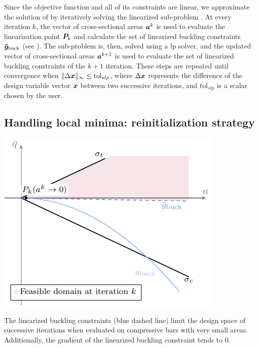 Since the objective function and all of its constraints are linear, we approximate the solution of  by iteratively solving the linearized sub-problem . At every iteration $k$, the vector of cross-sectional areas $\bm{a}^k$ is used to evaluate the linearization point $\bm{P}_{k}$ and calculate the set of linearized buckling constraints $\bm{\tilde{g}}_{\textrm{buck}}$ (see ). The sub-problem  is, then, solved using a \gls{lp} solver, and the updated vector of cross-sectional areas $\bm{a}^{k+1}$ is used to evaluate the set of linearized buckling constraints of the $k+1$ iteration. These steps are repeated until convergence \ie when $\lVert\Delta \bm{x}\rVert_\infty\leq \text{tol}_{slp}$, where $\Delta \bm{x}$ represents the difference of the design variable vector $\bm{x}$ between two successive iterations, and $\text{tol}_{slp}$ is a scalar chosen by the user.

\subsection{Handling local minima: reinitialization strategy}
\label{sec:04_reinit}
\begin{marginfigure}
    \centering
    \includegraphics[width=\linewidth]{figures/04_TTO_improvements/04_SLP_tiny_area_design_space/slp_tiny_design_space.pdf}
    \caption{The linearized buckling constraints (blue dashed line) limit the design space of successive iterations when evaluated on compressive bars with very small areas. Additionally, the gradient of the linearized buckling constraint tends to 0.}
    \label{fig:04_tiny-area}
\end{marginfigure}

